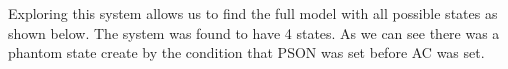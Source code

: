 
Exploring this system allows us to find the full model with all possible states as shown below.
The system was found to have 4 states.
As we can see there was a phantom state create by the condition that PSON was set before AC was set.
